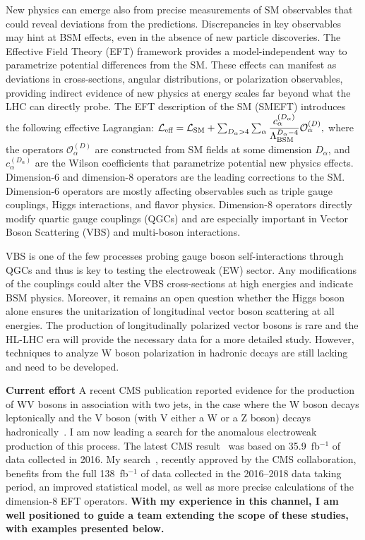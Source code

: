 {\begin{flushleft}
New physics can emerge also from precise measurements of SM observables that could reveal deviations from the predictions. Discrepancies in key observables may hint at BSM effects, even in the absence of new particle discoveries. The Effective Field Theory (EFT) framework provides a model-independent way to parametrize potential differences from the SM. These effects can manifest as deviations in cross-sections, angular distributions, or polarization observables, providing indirect evidence of new physics at energy scales far beyond what the LHC can directly probe.
The EFT description of the SM (SMEFT) introduces the following effective Lagrangian:
\begin{math}
    \mathcal{L}_{\text{eff}} = \mathcal{L}_{\text{SM}} + \sum_{D_\alpha>4}\sum_{\alpha}\dfrac{c_\alpha^{(D_\alpha)}}{\Lambda_{\text{BSM}}^{D_\alpha-4}}\mathcal{O}^{(D)}_\alpha \space,
\end{math}
where the operators $\mathcal{O}_\alpha^{(D)}$ are constructed from SM fields at some dimension $D_\alpha$, and $c_\alpha^{(D_\alpha)}$ are the Wilson coefficients that parametrize potential new physics effects. Dimension-6 and dimension-8 operators are the leading corrections to the SM. Dimension-6 operators are mostly affecting observables such as triple gauge couplings, Higgs interactions, and flavor physics. Dimension-8 operators directly modify quartic gauge couplings (QGCs) and are especially important in Vector Boson Scattering (VBS) and multi-boson interactions. 

VBS is one of the few processes probing gauge boson self-interactions through QGCs and thus is key to testing the electroweak (EW) sector. Any modifications of the couplings could alter the VBS cross-sections at high energies and indicate BSM physics.  
Moreover, it remains an open question whether the Higgs boson alone ensures the unitarization of longitudinal vector boson scattering at all energies. The production of longitudinally polarized vector bosons is rare and the HL-LHC era will provide the necessary data for a more detailed study. However, techniques to analyze W boson polarization in hadronic decays are still lacking and need to be developed.

\textbf{Current effort}
A recent CMS publication reported evidence for the production of WV bosons in association with two jets, in the case where the W boson decays leptonically and the V boson (with V either a W or a Z boson) decays hadronically~\cite{[4]}. I am now leading a search for the anomalous electroweak production of this process. The latest CMS result~\cite{[5]} was based on 35.9~fb$^{-1}$ of data collected in 2016. My search~\cite{[6]}, recently approved by the CMS collaboration, benefits from the full 138~fb$^{-1}$ of data collected in the 2016--2018 data taking period, an improved statistical model, as well as more precise calculations of the dimension-8 EFT operators. {\bf With my experience in this channel, I am well positioned to guide a team extending the scope of these studies, with examples presented below.}


\end{flushleft}}
